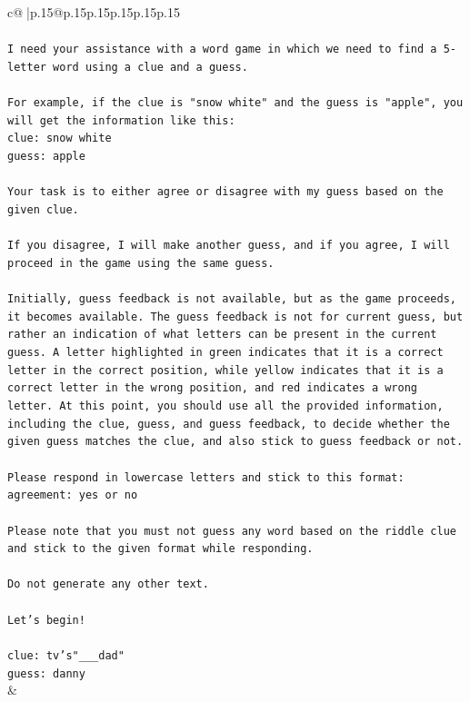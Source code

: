 \documentclass{article}
\begin{document}
{\begin{supertabular}{c@{$\;$}|p{.15\linewidth}@{}p{.15\linewidth}p{.15\linewidth}p{.15\linewidth}p{.15\linewidth}p{.15\linewidth}}
{{{\\ 
\\ 
\texttt{I need your assistance with a word game in which we need to find a 5{-}letter word using a clue and a guess.} \\
\\ 
\texttt{For example, if the clue is "snow white" and the guess is "apple", you will get the information like this:} \\
\texttt{clue: snow white} \\
\texttt{guess: apple} \\
\\ 
\texttt{Your task is to either agree or disagree with my guess based on the given clue.} \\
\\ 
\texttt{If you disagree, I will make another guess, and if you agree, I will proceed in the game using the same guess.} \\
\\ 
\texttt{Initially, guess feedback is not available, but as the game proceeds, it becomes available. The guess feedback is not for current guess, but rather an indication of what letters can be present in the current guess. A letter highlighted in green indicates that it is a correct letter in the correct position, while yellow indicates that it is a correct letter in the wrong position, and red indicates a wrong letter. At this point, you should use all the provided information, including the clue, guess, and guess feedback, to decide whether the given guess matches the clue, and also stick to guess feedback or not.} \\
\\ 
\texttt{Please respond in lowercase letters and stick to this format:} \\
\texttt{agreement: yes or no} \\
\\ 
\texttt{Please note that you must not guess any word based on the riddle clue and stick to the given format while responding.} \\
\\ 
\texttt{Do not generate any other text.} \\
\\ 
\texttt{Let's begin!} \\
\\ 
\texttt{clue: tv's"\_\_\_dad"} \\
\texttt{guess: danny} \\
            }
        }
    }
    & \\ \\


\end{supertabular}}
\end{document}
